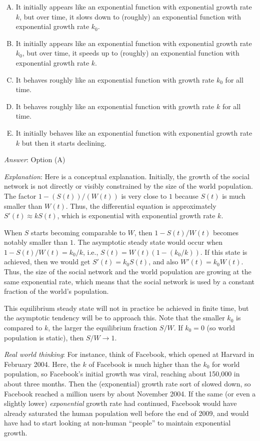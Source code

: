 \documentclass[10pt]{amsart}
\begin{document}
\begin{enumerate}
  \begin{enumerate}[(A)]
  \item It initially appears like an exponential function with
    exponential growth rate $k$, but over time, it slows down to
    (roughly) an exponential function with exponential growth rate
    $k_0$.
  \item It initially appears like an exponential function with
    exponential growth rate $k_0$, but over time, it speeds up to
    (roughly) an exponential function with exponential growth rate $k$.
  \item It behaves roughly like an exponential function with growth
    rate $k_0$ for all time.
  \item It behaves roughly like an exponential function with growth
    rate $k$ for all time.
  \item It initially behaves like an exponential function with
    exponential growth rate $k$ but then it starts declining.
  \end{enumerate}

  {\em Answer}: Option (A)

  {\em Explanation}: Here is a conceptual explanation. Initially, the
  growth of the social network is not directly or visibly constrained
  by the size of the world population. The factor $1 - (S(t))/(W(t))$
  is very close to $1$ because $S(t)$ is much smaller than
  $W(t)$. Thus, the differential equation is approximately $S'(t)
  \approx kS(t)$, which is exponential with exponential growth rate
  $k$.

  When $S$ starts becoming comparable to $W$, then $1 - S(t)/W(t)$
  becomes notably smaller than $1$. The asymptotic steady state would
  occur when $1 - S(t)/W(t) = k_0/k$, i.e., $S(t) = W(t)(1 -
  (k_0/k))$. If this state is achieved, then we would get $S'(t) =
  k_0S(t)$, and also $W'(t) = k_0W(t)$. Thus, the size of the social
  network and the world population are growing at the same exponential
  rate, which means that the social network is used by a constant
  fraction of the world's population.

  This equilibrium steady state will not in practice be achieved in
  finite time, but the asymptotic tendency will be to approach
  this. Note that the smaller $k_0$ is compared to $k$, the larger the
  equilibrium fraction $S/W$. If $k_0 = 0$ (so world population is
  static), then $S/W \to 1$.

  {\em Real world thinking}: For instance, think of Facebook, which
  opened at Harvard in February 2004. Here, the $k$ of Facebook is
  much higher than the $k_0$ for world population, so Facebook's
  initial growth was viral, reaching about 150,000 in about three
  months. Then the (exponential) growth rate sort of slowed down, so
  Facebook reached a million users by about November 2004. If the same
  (or even a slightly lower) {\em exponential} growth rate had
  continued, Facebook would have already saturated the human
  population well before the end of 2009, and would have had to start
  looking at non-human ``people'' to maintain exponential growth.


\end{enumerate}
\end{document}
